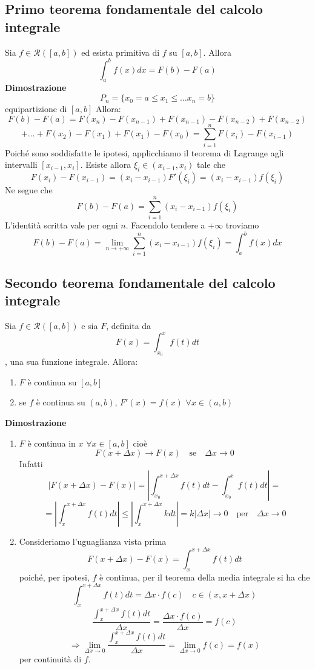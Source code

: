 \documentclass[12pt]{article}
\begin{document}
\subsection{Primo teorema fondamentale del calcolo integrale}
Sia $f \in \mathscr{R} ([a,b])$ ed esista primitiva di $f$ su $[a,b]$. Allora 
\[\int_{a}^{b} f(x) dx = F(b) - F(a)\]
\textbf{Dimostrazione}
\[ P_n = \{ x_0 = a \leq x_1 \leq \dots x_n = b \} \] equipartizione di $[a,b]$ Allora:
\[ F(b) - F(a) = F(x_n) - F(x_{n-1}) + F(x_{n-1}) - F(x_{n-2}) + F(x_{n-2})\]
\[+ \dots + F(x_2) - F(x_1) + F(x_1) - F(x_0) = \sum_{i = 1}^{n} F(x_i) - F(x_{i-1})\]
Poiché sono soddisfatte le ipotesi, applicchiamo il teorema di Lagrange agli intervalli $[x_{i-1}, x_i]$. Esiste allora $\xi_i \in (x_{i-1}, x_i)$ tale che
\[ F(x_i) - F(x_{i-1}) = (x_i - x_{i-1})F'(\xi_i) = (x_i - x_{i-1})f(\xi_i)\]
Ne segue che
\[F(b) - F(a) = \sum_{i = 1}^{n} (x_i - x_{i-1})f(\xi_i) \]
L'identità scritta vale per ogni $n$. Facendolo tendere a $+\infty$ troviamo
\[\displaystyle F(b) - F(a) = \lim_{n \to +\infty} \sum_{i = 1}^{n} (x_i - x_{i-1})f(\xi_i) = \int_{a}^{b} f(x) dx\]

\subsection{Secondo teorema fondamentale del calcolo integrale}
Sia $f \in \mathscr{R}([a,b])$ e sia $F$, definita da 
\[F(x) = \int_{x_0}^x f(t) dt\]
, una sua funzione integrale. Allora:
\begin{enumerate}
  \item $F$ è continua su $[a,b]$
  \item se $f$ è continua su $(a,b)$, $F'(x) = f(x)$ $\forall x \in (a,b)$
\end{enumerate}
\textbf{Dimostrazione}
\begin{enumerate}
    \item 
    $F$ è continua in $x$ $\forall x \in [a,b]$ cioè
\[F(x + \Delta x) \to F(x) \quad \text{se} \quad \Delta x \to 0\] Infatti
\[|F(x + \Delta x) - F(x)| = |\int_{x_0}^{x + \Delta x} f(t) dt - \int_{x_0}^{x} f(t) dt| = \]
\[ = |\int_{x}^{x+\Delta x} f(t) dt| \leq |\int_{x}^{x+\Delta x} k dt| = k|\Delta x| \to 0 \quad \text{per} \quad \Delta x \to 0\]
    \item
    Consideriamo l'uguaglianza vista prima
\[F(x + \Delta x) - F(x) = \int_{x}^{x+\Delta x} f(t) dt\]
poiché, per ipotesi, $f$ è continua, per il teorema della media integrale si ha che
\[ \int_{x}^{x+\Delta x} f(t) dt = \Delta x \cdot f(c) \quad c \in (x, x+\Delta x)\]
\[\frac{\int_{x}^{x+\Delta x} f(t) dt}{\Delta x} = \frac{\Delta x \cdot f(c)}{\Delta x} = f(c)\]
\[ \Rightarrow \lim_{\Delta x \to 0} \frac{\int_{x}^{x+\Delta x} f(t) dt}{\Delta x} = \lim_{\Delta x \to 0} f(c) = f(x) \]
per continuità di $f$.
\end{enumerate}
\end{document}
